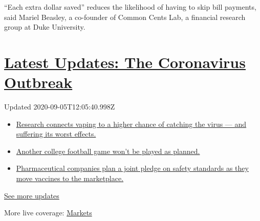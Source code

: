 ``Each extra dollar saved'' reduces the likelihood of having to skip
bill payments, said Mariel Beasley, a co-founder of Common Cents Lab, a
financial research group at Duke University.

\hypertarget{latest-updates-the-coronavirus-outbreak}{%
\section{\texorpdfstring{\href{https://www.nytimes3xbfgragh.onion/2020/09/04/world/covid-19-coronavirus.html?action=click\&pgtype=Article\&state=default\&region=MAIN_CONTENT_1\&context=storylines_live_updates}{Latest
Updates: The Coronavirus
Outbreak}}{Latest Updates: The Coronavirus Outbreak}}\label{latest-updates-the-coronavirus-outbreak}}

Updated 2020-09-05T12:05:40.998Z

\begin{itemize}
\tightlist
\item
  \href{https://www.nytimes3xbfgragh.onion/2020/09/04/world/covid-19-coronavirus.html?action=click\&pgtype=Article\&state=default\&region=MAIN_CONTENT_1\&context=storylines_live_updates\#link-1654f6ad}{Research
  connects vaping to a higher chance of catching the virus --- and
  suffering its worst effects.}
\item
  \href{https://www.nytimes3xbfgragh.onion/2020/09/04/world/covid-19-coronavirus.html?action=click\&pgtype=Article\&state=default\&region=MAIN_CONTENT_1\&context=storylines_live_updates\#link-52e4198a}{Another
  college football game won't be played as planned.}
\item
  \href{https://www.nytimes3xbfgragh.onion/2020/09/04/world/covid-19-coronavirus.html?action=click\&pgtype=Article\&state=default\&region=MAIN_CONTENT_1\&context=storylines_live_updates\#link-181cef0}{Pharmaceutical
  companies plan a joint pledge on safety standards as they move
  vaccines to the marketplace.}
\end{itemize}

\href{https://www.nytimes3xbfgragh.onion/2020/09/04/world/covid-19-coronavirus.html?action=click\&pgtype=Article\&state=default\&region=MAIN_CONTENT_1\&context=storylines_live_updates}{See
more updates}

More live coverage:
\href{https://www.nytimes3xbfgragh.onion/live/2020/09/04/business/stock-market-today-coronavirus?action=click\&pgtype=Article\&state=default\&region=MAIN_CONTENT_1\&context=storylines_live_updates}{Markets}

